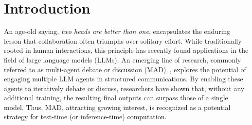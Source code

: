 
\section{Introduction}
An age-old saying, \emph{two heads are better than one}, encapsulates the enduring lesson that collaboration often triumphs over solitary effort. While traditionally rooted in human interactions, this principle has recently found applications in the field of large language models (LLMs).
An emerging line of research, commonly referred to as multi-agent debate or discussion (MAD)~\cite{duimproving, yin2023exchange, liang2023encouraging, chen2023agentverse, chanchateval, wang2024rethinking, smit2023we}, explores the potential of engaging multiple LLM agents in structured communications. 
By enabling these agents to iteratively debate or discuss, researchers have shown that, without any additional training, the resulting final outputs can surpass those of a single model. Thus, MAD, attracting growing interest, is recognized as a potential strategy for test-time (or inference-time) computation. 

\begin{table*}[htb]
\caption{High-level comparison of MAD frameworks.}
\label{tab:mad_features}
\end{table*}

